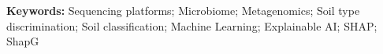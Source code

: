 \documentclass[12pt]{article}
\theoremstyle{thmstyleone}%
\theoremstyle{thmstyletwo}%
\theoremstyle{thmstylethree}%
\begin{document}
% 
% 
% 

\noindent\textbf{Keywords:} Sequencing platforms; Microbiome; Metagenomics; Soil type discrimination; Soil classification; Machine Learning; Explainable AI; SHAP; ShapG



\maketitle
\end{document}
